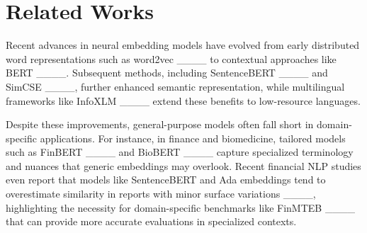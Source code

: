 \section{Related Works}
Recent advances in neural embedding models have evolved from early distributed word representations such as word2vec ____ to contextual approaches like BERT ____. Subsequent methods, including SentenceBERT ____ and SimCSE ____, further enhanced semantic representation, while multilingual frameworks like InfoXLM ____ extend these benefits to low-resource languages.

Despite these improvements, general-purpose models often fall short in domain-specific applications. For instance, in finance and biomedicine, tailored models such as FinBERT ____ and BioBERT ____ capture specialized terminology and nuances that generic embeddings may overlook. Recent financial NLP studies even report that models like SentenceBERT and Ada embeddings tend to overestimate similarity in reports with minor surface variations ____, highlighting the necessity for domain-specific benchmarks like FinMTEB ____ that can provide more accurate evaluations in specialized contexts.